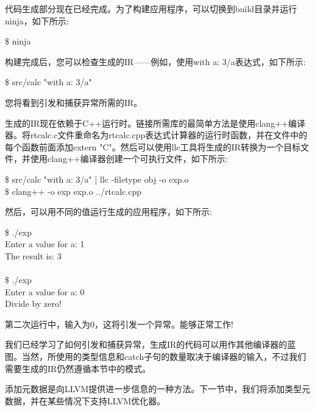 代码生成部分现在已经完成。为了构建应用程序，可以切换到build目录并运行ninja，如下所示:\par

\begin{tcolorbox}[colback=white,colframe=black]
\$ ninja
\end{tcolorbox}

构建完成后，您可以检查生成的IR——例如，使用with a: 3/a表达式，如下所示:\par

\begin{tcolorbox}[colback=white,colframe=black]
\$ src/calc "with a: 3/a"
\end{tcolorbox}

您将看到引发和捕获异常所需的IR。\par

生成的IR现在依赖于C++运行时。链接所需库的最简单方法是使用clang++编译器。将rtcalc.c文件重命名为rtcalc.cpp表达式计算器的运行时函数，并在文件中的每个函数前面添加extern "C"。然后可以使用llc工具将生成的IR转换为一个目标文件，并使用clang++编译器创建一个可执行文件，如下所示:\par

\begin{tcolorbox}[colback=white,colframe=black]
\$ src/calc "with a: 3/a" | llc -filetype obj -o exp.o \\
\$ clang++ -o exp exp.o ../rtcalc.cpp
\end{tcolorbox}

然后，可以用不同的值运行生成的应用程序，如下所示:\par

\begin{tcolorbox}[colback=white,colframe=black]
\$ ./exp \\
Enter a value for a: 1 \\
The result is: 3\\
\\
\$ ./exp \\
Enter a value for a: 0 \\
Divide by zero!
\end{tcolorbox}

第二次运行中，输入为0，这将引发一个异常。能够正常工作!\par

我们已经学习了如何引发和捕获异常，生成IR的代码可以用作其他编译器的蓝图。当然，所使用的类型信息和catch子句的数量取决于编译器的输入，不过我们需要生成的IR仍然遵循本节中的模式。\par

添加元数据是向LLVM提供进一步信息的一种方法。下一节中，我们将添加类型元数据，并在某些情况下支持LLVM优化器。\par










